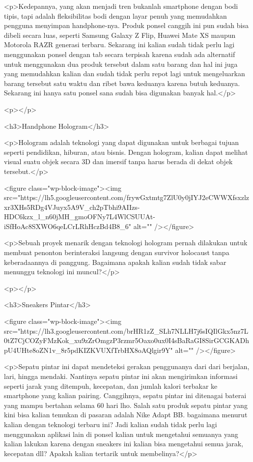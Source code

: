 <p>Kedepannya, yang akan menjadi tren bukanlah smartphone dengan bodi tipis, tapi adalah fleksibilitas bodi dengan layar penuh yang memudahkan pengguna menyimpan handphone-nya. Produk ponsel canggih ini pun sudah bisa dibeli secara luas, seperti Samsung Galaxy Z Flip, Huawei Mate XS maupun Motorola RAZR generasi terbaru. Sekarang ini kalian sudah tidak perlu lagi menggunakan ponsel dengan tab secara terpisah karena sudah ada alternatif untuk menggunakan dua produk tersebut dalam satu barang dan hal ini juga yang memudahkan kalian dan sudah tidak perlu repot lagi untuk mengeluarkan barang tersebut satu waktu dan ribet bawa keduanya karena butuh keduanya. Sekarang ini hanya satu ponsel sana sudah bisa digunakan banyak hal.</p>



<p></p>



<h3>Handphone Hologram</h3>



<p>Hologram adalah teknologi yang dapat digunakan untuk berbagai tujuan seperti pendidikan, hiburan, atau bisnis. Dengan hologram, kalian dapat melihat visual suatu objek secara 3D dan imersif tanpa harus berada di dekat objek tersebut.</p>



<figure class="wp-block-image"><img src="https://lh5.googleusercontent.com/frywGxtmtg7ZlU0y0jIYJ2eCWWXfsxzlzxr3XHs5RDg4VJuyx5A9V_ch2pTbhi9AIIzs-HDC6kzx_l_n60jMH_gmoOFNy7L4WlCSUUAt-iSfHoAc8SXWO6qeLCrLRhHczBd4B8_6" alt="" /></figure>



<p>Sebuah proyek menarik dengan teknologi hologram pernah dilakukan untuk membuat penonton berinteraksi langsung dengan survivor holocaust tanpa keberadaannya di panggung. Bagaimana apakah kalian sudah tidak sabar menunggu teknologi ini muncul?</p>



<p></p>



<h3>Sneakers Pintar</h3>



<figure class="wp-block-image"><img src="https://lh3.googleusercontent.com/brHR1zZ_SLh7NLLH7j6sIQIlGkx5nz7L0tZ7CjCOZyFMzKok_xu9zZrOmgzP3rzmr5Oaxo0ux0I4sBaRaGI8SirGCGKADhpU4UHte8oZN1v_8r5pdKIZKVUXfTrbHX8oAQlgir9Y" alt="" /></figure>



<p>Sepatu pintar ini dapat mendeteksi gerakan penggunanya dari dari berjalan, lari, hingga mendaki. Nantinya sepatu pintar ini akan mengirimkan informasi seperti jarak yang ditempuh, kecepatan, dan jumlah kalori terbakar ke smartphone yang kalian pairing. Canggihnya, sepatu pintar ini ditenagai baterai yang mampu bertahan selama 60 hari lho. Salah satu produk sepatu pintar yang kini bisa kalian temukan di pasaran adalah Nike Adapt BB. bagaimana menurut kalian dengan teknologi terbaru ini? Jadi kalian sudah tidak perlu lagi menggunakan aplikasi lain di ponsel kalian untuk mengetahui semuanya yang kalian lakukan karena dengan sneakers ini kalian bisa mengetahui semua jarak, kecepatan dll? Apakah kalian tertarik untuk membelinya?</p>



